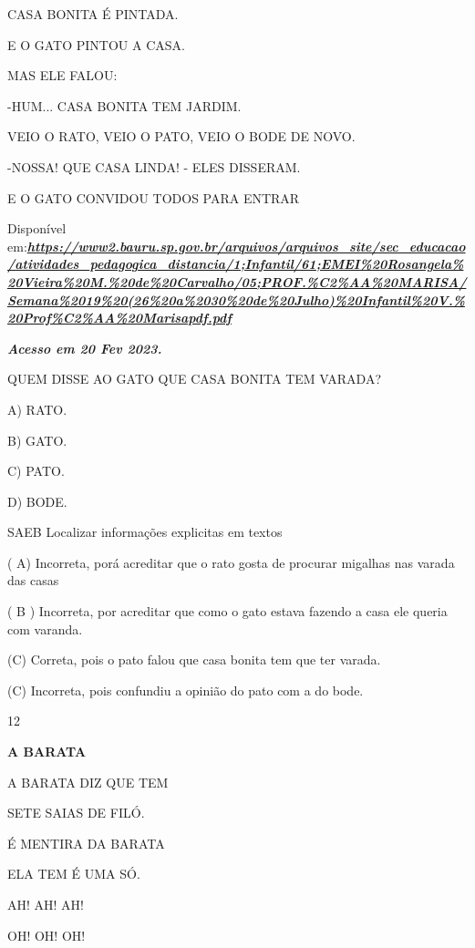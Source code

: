 \begin{escola}
{{{{{{{{{{{CASA BONITA É PINTADA.

E O GATO PINTOU A CASA.

MAS ELE FALOU:

-HUM... CASA BONITA TEM JARDIM.

VEIO O RATO, VEIO O PATO, VEIO O BODE DE NOVO.

-NOSSA! QUE CASA LINDA! - ELES DISSERAM.

E O GATO CONVIDOU TODOS PARA ENTRAR

Disponível
em:\href{https://www2.bauru.sp.gov.br/arquivos/arquivos_site/sec_educacao/atividades_pedagogica_distancia/1;Infantil/61;EMEI\%20Rosangela\%20Vieira\%20M.\%20de\%20Carvalho/05;PROF.\%C2\%AA\%20MARISA/Semana\%2019\%20(26\%20a\%2030\%20de\%20Julho)\%20Infantil\%20V.\%20Prof\%C2\%AA\%20Marisapdf.pdf}{\textbf{\emph{https://www2.bauru.sp.gov.br/arquivos/arquivos\_site/sec\_educacao/atividades\_pedagogica\_distancia/1;Infantil/61;EMEI\%20Rosangela\%20Vieira\%20M.\%20de\%20Carvalho/05;PROF.\%C2\%AA\%20MARISA/Semana\%2019\%20(26\%20a\%2030\%20de\%20Julho)\%20Infantil\%20V.\%20Prof\%C2\%AA\%20Marisapdf.pdf}}}

\textbf{\emph{Acesso em 20 Fev 2023.}}

QUEM DISSE AO GATO QUE CASA BONITA TEM VARADA?

A) RATO.

B) GATO.

C) PATO.

D) BODE.

\protect\hypertarget{_heading=h.28h4qwu}{}{}SAEB Localizar informações
explicitas em textos

( A) Incorreta, porá acreditar que o rato gosta de procurar migalhas nas
varada das casas

( B ) Incorreta, por acreditar que como o gato estava fazendo a casa ele
queria com varanda.

(C) Correta, pois o pato falou que casa bonita tem que ter varada.

(C) Incorreta, pois confundiu a opinião do pato com a do bode.

\num{12}

\textbf{A BARATA}

A BARATA DIZ QUE TEM

SETE SAIAS DE FILÓ.

É MENTIRA DA BARATA

ELA TEM É UMA SÓ.

AH! AH! AH!

OH! OH! OH!

}}}}}}}}}}}
\end{escola}
